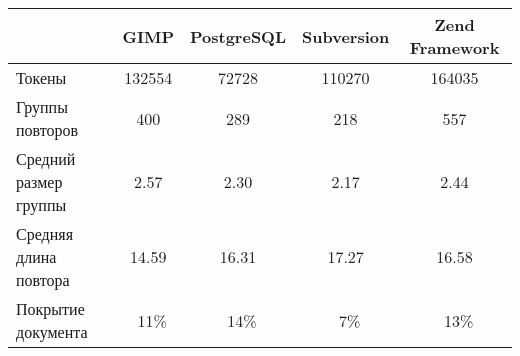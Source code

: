 \begin{minipage}{0.9\textwidth}
\begin{adjustbox}{center}
\begin{tabular}{|l||c|c|c|c|}
	\hline
	& GIMP & PostgreSQL & Subversion & Zend Framework \\
	\hline
	\hline
	Токены & 132554 & 72728 & 110270 & 164035 \\
	\hline
	Группы повторов & 400 & 289 & 218  & 557 \\
	\hline
	Средний размер группы & 2.57 & 2.30 & 2.17 & 2.44 \\
	\hline
	Средняя длина повтора & 14.59 & 16.31 & 17.27 & 16.58 \\
	\hline
	Покрытие документа & ~11\% & ~14\% & ~7\% & ~13\% \\
	\hline
	
\end{tabular}
\end{adjustbox}
\end{minipage}